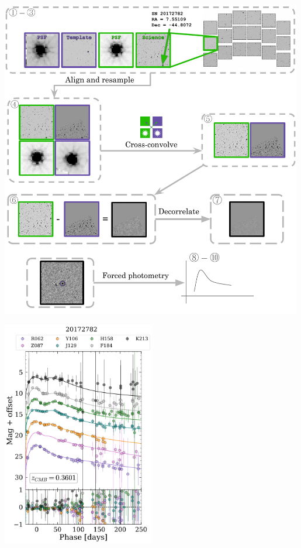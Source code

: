 \documentclass[10pt,a4paper,onecolumn]{article}
\let\origfigure\figure
\let\endorigfigure\endfigure
\renewenvironment{figure}[1][2] {
    \expandafter\origfigure\expandafter[H]
} {
    \endorigfigure
}
\begin{document}
\begin{figure}
   \centering
   \includegraphics[width=0.99\textwidth]{pipelinefigure.pdf}
   \caption{Visualization of pipeline steps using a sample image from the @openuniverse simulations. Green outlines represent the science image, purple outlines represent the template image, and black outlines represent the difference image. The small inset green and purple squares in panel 1 represent 100 x 100 pixel cutouts.}
   \label{fig:pipeline}
\end{figure}

\begin{figure}
   \centering
   \includegraphics[width=0.5\textwidth]{20172782_lc.pdf}
   \caption{An example light curve, generated using the output of `phrosty`. Circles indicate measured output from `phrosty`, and solid lines are the known simulated light curve from @openuniverse.}
   \label{fig:lc}
\end{figure}
\end{document}
